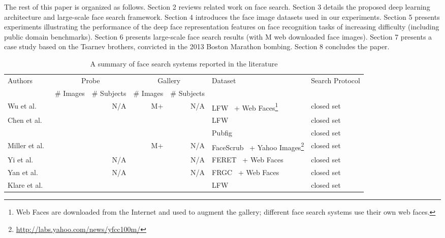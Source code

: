 \documentclass[10pt,journal,compsoc]{IEEEtran}
\begin{document}
The rest of this paper is organized as follows. Section 2 reviews related work on face search. Section 3 details the proposed deep learning architecture and large-scale face search framework. Section 4 introduces the face image datasets used in our experiments. Section 5 presents experiments illustrating the performance of the deep face representation features on face recognition tasks of increasing difficulty (including public domain benchmarks). Section 6 presents large-scale face search results (with M web downloaded face images). Section 7 presents a case study based on the Tsarnev brothers, convicted in the 2013 Boston Marathon bombing. Section 8 concludes the paper.

\begin{table*}[htbp]
\begin{minipage}{\textwidth}
\centering
\caption{A summary of face search systems reported in the literature}\label{tab:fr}
\begin{tabular}{lrrrrll}
\toprule
\multirow{2}{*}{Authors} & \multicolumn{2}{c}{Probe} & \multicolumn{2}{c}{Gallery} & \multirow{2}{*}{Dataset} & \multirow{2}{*}{Search Protocol} \\ \cmidrule(lr){2-3} \cmidrule(lr){4-5}
            & \# Images  & \# Subjects & \# Images & \# Subjects &              &                    \\ \midrule
Wu et al.~\cite{faceretrieval:wu2010}     &     & N/A    & M+ & N/A   & LFW~\cite{DB:LFWTech} + Web Faces\footnote{Web Faces are downloaded from the Internet and used to augment the gallery; different face search systems use their own web faces.} & closed set\\
Chen et al.~\cite{faceretrieval:chen2012} &     &  &     &  & LFW~\cite{DB:LFWTech} & closed set\\
                                          &   &  &     &    & Pubfig~\cite{CAVE_0296} & closed set\\
Miller et al.~\cite{miller2015megaface}   &   &  & M+ & N/A       & FaceScrub~\cite{db:facecrab} + Yahoo Images\footnote{\url{http://labs.yahoo.com/news/yfcc100m/}} & closed set\\
Yi et al.~\cite{fr:fastmatching}          &   & N/A    &    & N/A       & FERET~\cite{db:FERET} + Web Faces & closed set \\
Yan et al.~\cite{fr:sh}                   &  &  N/A   &    & N/A       & FRGC~\cite{db:frgc} + Web Faces & closed set \\
Klare et al.~\cite{fr:cots_cluster}       &     & &        &    & LFW~\cite{DB:LFWTech} & closed set\\

\end{tabular}
\end{minipage}
\end{table*}
\end{document}
